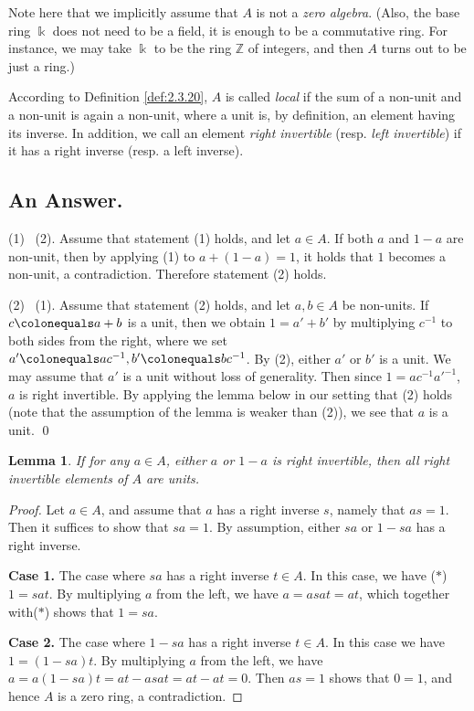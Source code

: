 \documentclass{surv-l}
\numberwithin{equation}{chapter}
\numberwithin{figure}{chapter}
\theoremstyle{plain}
\newtheorem{lem}[thm]{Lemma}
\theoremstyle{definition}
\theoremstyle{remark}
\begin{document}
Note here that we  implicitly assume that $A$ is not a \emph{zero algebra}.
(Also, the base ring $\Bbbk$ does not need to be a field, it is enough to be a commutative ring.
For instance, we may take $\Bbbk$ to be the ring $\mathbb{Z}$ of integers, and then
$A$ turns out to be just a ring.)

According to Definition \ref{def:2.3.20}, $A$ is called \emph{local}
if the sum of a non-unit and a non-unit is again a non-unit,
where a unit is, by definition, an element having its inverse.
In addition, we call an element \emph{right invertible} (resp. \emph{left invertible})
if it has a right inverse (resp. a left inverse).



\subsection*{An Answer.}

(1) \text{$\Rightarrow$}\  (2).
Assume that statement (1) holds, and let $a \in A$.
If both $a$ and $1-a$ are non-unit, then by applying (1) to
$a + (1-a) = 1$, it holds that $1$ becomes a non-unit, a contradiction.
Therefore statement (2) holds.

(2) \text{$\Rightarrow$}\  (1).
Assume that statement (2) holds, and let $a, b \in A$ be non-units.
If $c\colonequals  a+b$ is a unit, then we obtain $1 = a' + b'$ by multiplying $c^{-1}$ to both sides from the right,
where we set $a'\colonequals  ac^{-1}, b'\colonequals  bc^{-1}$.
By (2), either $a'$ or $b'$ is a unit.
We may assume that $a'$ is a unit without loss of generality.
Then since $1 = ac^{-1} {a'}^{-1}$, $a$ is right invertible.
By applying the lemma below in our setting that (2) holds
(note that the assumption of the lemma is weaker than (2)),
we see that $a$ is a unit.
\qed

\begin{lem}
If for any $a \in A$, either $a$ or $1-a$ is right invertible,
then all right invertible elements of $A$ are units.
\end{lem}

\begin{proof}
Let $a \in A$, and assume that $a$ has a right inverse $s$, namely
that $as = 1$.
Then it suffices to show that $sa = 1$.
By assumption, either $sa$ or $1 - sa$ has a right inverse.

{\bf Case 1.} The case where $sa$ has a right inverse $t \in A$.
In this case, we have ($*$) \ $1 = sat$.
By multiplying $a$ from the left, we have $a = asat = at$,
which together with($*$) shows that $1 = sa$.

{\bf Case 2.} The case where $1- sa$ has a right inverse $t \in A$.
In this case we have $1 = (1 - sa)t$.
By multiplying $a$ from the left, we have $a = a(1 - sa)t = at - asat = at - at = 0$.
Then $as = 1$ shows that $0 = 1$, and hence $A$ is a zero ring, a contradiction.
\end{proof}
\end{document}
